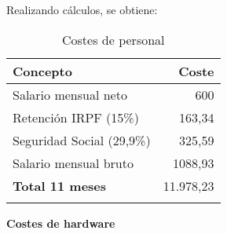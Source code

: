 Realizando cálculos, se obtiene:
\begin{longtable}[]{@{}lr@{}}
	\toprule
	\begin{minipage}[b]{0.38\columnwidth}\raggedright\strut
		\textbf{Concepto}\strut
	\end{minipage} & \begin{minipage}[b]{0.20\columnwidth}\raggedright\strut
		\textbf{Coste}\strut
	\end{minipage}\tabularnewline
	\midrule
	\endhead
	\begin{minipage}[t]{0.38\columnwidth}\raggedright\strut
		Salario mensual neto\strut
	\end{minipage} & \begin{minipage}[t]{0.20\columnwidth}\raggedright\strut
		600 \officialeuro\strut
	\end{minipage}\tabularnewline
	\begin{minipage}[t]{0.38\columnwidth}\raggedright\strut
		Retención IRPF (15\%)\strut
	\end{minipage} & \begin{minipage}[t]{0.20\columnwidth}\raggedright\strut
		163,34 \officialeuro\strut
	\end{minipage}\tabularnewline
	\begin{minipage}[t]{0.38\columnwidth}\raggedright\strut
		Seguridad Social (29,9\%)\strut
	\end{minipage} & \begin{minipage}[t]{0.20\columnwidth}\raggedright\strut
		325,59 \officialeuro\strut
	\end{minipage}\tabularnewline
	\begin{minipage}[t]{0.38\columnwidth}\raggedright\strut
		Salario mensual bruto\strut
	\end{minipage} & \begin{minipage}[t]{0.20\columnwidth}\raggedright\strut
		1088,93 \officialeuro\strut
	\end{minipage}\tabularnewline
	\midrule
	\begin{minipage}[t]{0.38\columnwidth}\raggedright\strut
		\textbf{Total 11 meses}\strut
	\end{minipage} & \begin{minipage}[t]{0.20\columnwidth}\raggedright\strut
		11.978,23 \officialeuro\strut
	\end{minipage}\tabularnewline
	\bottomrule
	\caption{Costes de personal}
\end{longtable}

\textbf{Costes de hardware}

